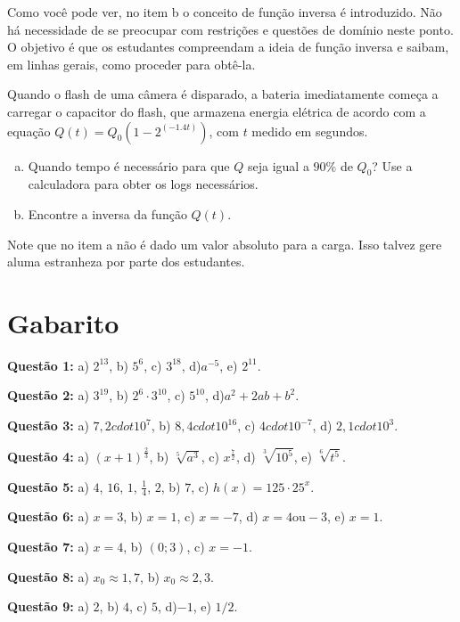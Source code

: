 \documentclass[main_estudante.tex]{subfiles}
\begin{document}
Como você pode ver, no item b o conceito de função inversa é introduzido. Não há necessidade de se preocupar com restrições e questões de domínio neste ponto. O objetivo é que os estudantes compreendam a ideia de função inversa e saibam, em linhas gerais, como proceder para obtê-la.

\begin{resolva}
Quando o flash de uma câmera é disparado, a bateria imediatamente começa a carregar o capacitor do flash, que armazena energia elétrica de acordo com a equação $Q(t)=Q_0(1-2^(-1.4t))$, com $t$ medido em segundos.
\begin{enumerate}[a)]
 \item Quando tempo é necessário para que $Q$ seja igual a $90\%$ de $Q_0$? Use a calculadora para obter os logs necessários.
 \item Encontre a inversa da função $Q(t)$.
\end{enumerate}
\end{resolva}

Note que no item a não é dado um valor absoluto para a carga. Isso talvez gere aluma estranheza por parte dos estudantes.

\section{Gabarito}

\noindent\textbf{Questão 1:} a) $2^{13}$, b) $5^6$, c) $3^{18}$, d)$a^{-5}$, e) $2^{11}$.

\noindent\textbf{Questão 2:} a) $3^{19}$, b) $2^6 \cdot 3^{10}$, c) $5^{10}$, d)$a^2+2ab+b^2$.

\noindent\textbf{Questão 3:} a) $7,2 cdot 10^{7}$, b) $8,4 cdot 10^{16}$, c) $4 cdot 10^{-7}$, d) $2,1 cdot 10^{3}$.

\noindent\textbf{Questão 4:} a) $(x+1)^{\frac{2}{3}}$, b) $\sqrt[5]{a^3}$, c) $x^{\frac{7}{2}}$, d) $\sqrt[3]{10^5}$, e) $\sqrt[6]{t^5}$.

\noindent\textbf{Questão 5:} a) $4$, $16$, $1$, $\frac{1}{4}$, $2$, b) $7$, c) $h(x)=125 \cdot 25^x$.

\noindent\textbf{Questão 6:} a) $x=3$, b) $x=1$, c) $x=-7$, d) $x=4 \text{ou} -3$, e) $x=1$.

\noindent\textbf{Questão 7:} a) $x=4$, b) $(0;3)$, c) $x=-1$.

\noindent\textbf{Questão 8:} a) $x_0 \approx 1,7$, b) $x_0 \approx 2,3$.

\noindent\textbf{Questão 9:} a) $2$, b) $4$, c) $5$, d)$-1$, e) $1/2$.
\end{document}
